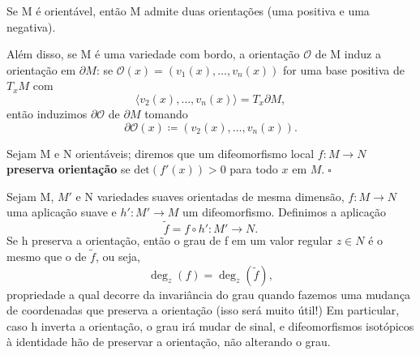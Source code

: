 \documentclass[../differential_topology.tex]{subfiles}
\begin{document}
\begin{tcolorbox}[
		skin=enhanced,
		title=Observação,
		fonttitle=\bfseries,
		colframe=black,
		colbacktitle=cyan!75!white,
		colback=cyan!15,
		colbacklower=black,
		coltitle=black,
		drop fuzzy shadow,
	]
	Se M é orientável, então M admite duas orientações (uma positiva e uma negativa).

	Além disso, se M é uma variedade com bordo, a orientação \(\mathcal{O}\) de M induz a orientação em \(\partial M\): se \(\mathcal{O}(x)=(v_1(x), \dotsc , v_{n}(x))\) for uma base positiva de \(T_{x}M\) com
	\[
		\langle v_2(x), \dotsc , v_{n}(x) \rangle = T_{x}\partial M,
	\]
	então induzimos \(\partial \mathcal{O}\) de \(\partial M\) tomando
	\[
		\partial \mathcal{O}(x) \coloneqq (v_2(x), \dotsc , v_{n}(x)).
	\]
\end{tcolorbox}

\begin{def*}
	Sejam M e N orientáveis; diremos que um difeomorfismo local \(f:M\rightarrow N\) \textbf{preserva orientação} se \(\mathrm{det}(f'(x))>0\) para todo \(x\) em \(M.\; \square\)
\end{def*}

Sejam M, \(M'\) e N variedades suaves orientadas de mesma dimensão, \(f:M\rightarrow N\) uma aplicação suave e \(h':M'\rightarrow M\) um difeomorfismo.
Definimos a aplicação
\[
	\tilde{f} = f\circ h':M'\rightarrow N.
\]
Se h preserva a orientação, então o grau de f em um valor regular \(z\in N\) é o mesmo que o de \(\tilde{f}\), ou seja,
\[
	\deg_z{(f)} = \deg_z{(\tilde{f})},
\]
propriedade a qual decorre da invariância do grau quando fazemos uma mudança de coordenadas que preserva a orientação (isso será muito útil!)
Em particular, caso h inverta a orientação, o grau irá mudar de sinal, e difeomorfismos isotópicos à identidade hão de preservar a orientação, não alterando o grau.
\end{document}
